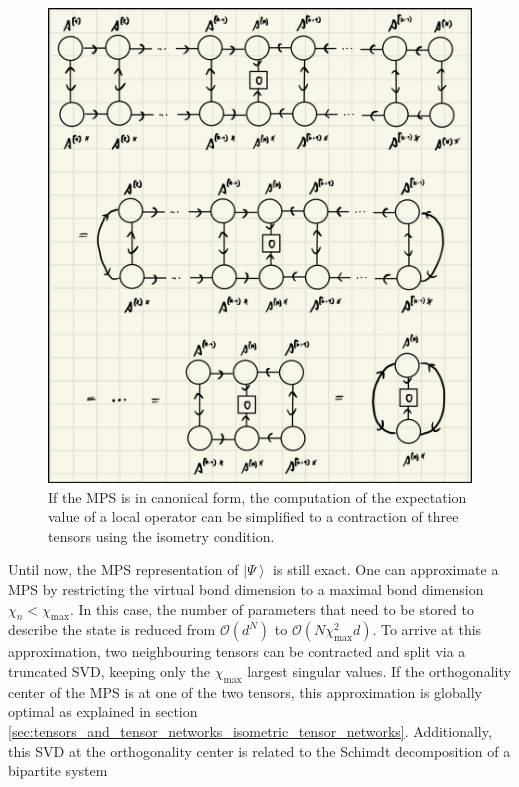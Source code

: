 \begin{figure}
	\centering
	\includegraphics[width=\textwidth]{figures/Tensor_Networks/mps_local_expectation_value_canonical.jpeg}
	\caption{If the MPS is in canonical form, the computation of the expectation value of a local operator can be simplified to a contraction of three tensors using the isometry condition.}
	\label{fig:mps_local_expectation_value_canonical}
\end{figure}
Until now, the MPS representation of $\left|\Psi\right\rangle$ is still exact. One can approximate a MPS by restricting the virtual bond dimension to a maximal bond dimension $\chi_n < \chi_\text{max}$. In this case, the number of parameters that need to be stored to describe the state is reduced from $\mathcal{O}\left(d^N\right)$ to $\mathcal{O}\left(N\chi_\text{max}^2 d\right)$. To arrive at this approximation, two neighbouring tensors can be contracted and split via a truncated SVD, keeping only the $\chi_\text{max}$ largest singular values. If the orthogonality center of the MPS is at one of the two tensors, this approximation is globally optimal as explained in section \ref{sec:tensors_and_tensor_networks_isometric_tensor_networks}. Additionally, this SVD at the orthogonality center is related to the Schimdt decomposition of a bipartite system
